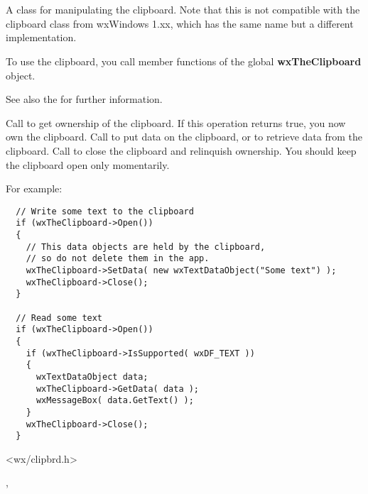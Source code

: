 \section{}\label{wxclipboard}

A class for manipulating the clipboard. Note that this is not compatible with the
clipboard class from wxWindows 1.xx, which has the same name but a different implementation.

To use the clipboard, you call member functions of the global {\bf wxTheClipboard} object.

See also the  for further information.

Call  to get ownership of the clipboard. If this operation returns true, you
now own the clipboard. Call  to put data
on the clipboard, or  to
retrieve data from the clipboard. Call  to close
the clipboard and relinquish ownership. You should keep the clipboard open only momentarily.

For example:

\begin{verbatim}
  // Write some text to the clipboard
  if (wxTheClipboard->Open())
  {
    // This data objects are held by the clipboard, 
    // so do not delete them in the app.
    wxTheClipboard->SetData( new wxTextDataObject("Some text") );
    wxTheClipboard->Close();
  }

  // Read some text
  if (wxTheClipboard->Open())
  {
    if (wxTheClipboard->IsSupported( wxDF_TEXT ))
    {
      wxTextDataObject data;
      wxTheClipboard->GetData( data );
      wxMessageBox( data.GetText() );
    }  
    wxTheClipboard->Close();
  }
\end{verbatim}




<wx/clipbrd.h>


, 




